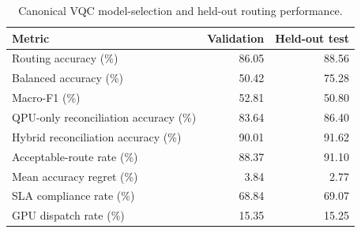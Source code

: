 \begin{table}[t]
\centering
\small
\caption{Canonical VQC model-selection and held-out routing performance.}
\label{tab:vqc-model-selection}
\begin{tabular}{lrr}
\toprule
Metric & Validation & Held-out test \\
\midrule
Routing accuracy (\%) & 86.05 & 88.56 \\
Balanced accuracy (\%) & 50.42 & 75.28 \\
Macro-F1 (\%) & 52.81 & 50.80 \\
QPU-only reconciliation accuracy (\%) & 83.64 & 86.40 \\
Hybrid reconciliation accuracy (\%) & 90.01 & 91.62 \\
Acceptable-route rate (\%) & 88.37 & 91.10 \\
Mean accuracy regret (\%) & 3.84 & 2.77 \\
SLA compliance rate (\%) & 68.84 & 69.07 \\
GPU dispatch rate (\%) & 15.35 & 15.25 \\
\bottomrule
\end{tabular}
\end{table}
